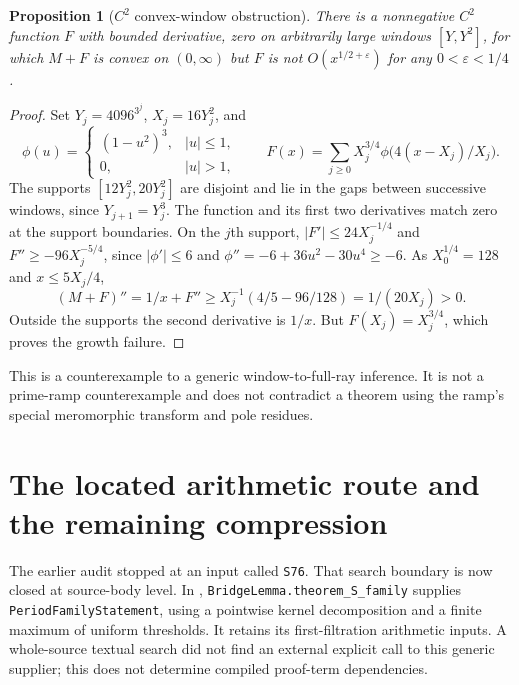 \documentclass[11pt,letterpaper]{article}
\newtheorem{proposition}[theorem]{Proposition}
\theoremstyle{definition}
\theoremstyle{remark}
\numberwithin{equation}{section}
\begin{document}
\begin{proposition}[$C^2$ convex-window obstruction]\label{prop:windows}
There is a nonnegative $C^2$ function $F$ with bounded derivative, zero on arbitrarily large windows $[Y,Y^2]$, for which $M+F$ is convex on $(0,\infty)$ but $F$ is not $O(x^{1/2+\varepsilon})$ for any $0<\varepsilon<1/4$.
\end{proposition}
\begin{proof}
Set $Y_j=4096^{3^j}$, $X_j=16Y_j^2$, and
\[
 \phi(u)=\begin{cases}(1-u^2)^3,&|u|\le1,\\0,&|u|>1,\end{cases}
 \qquad F(x)=\sum_{j\ge0}X_j^{3/4}\phi\bigl(4(x-X_j)/X_j\bigr).
\]
The supports $[12Y_j^2,20Y_j^2]$ are disjoint and lie in the gaps between successive windows, since $Y_{j+1}=Y_j^3$. The function and its first two derivatives match zero at the support boundaries. On the $j$th support, $|F'|\le24X_j^{-1/4}$ and $F''\ge-96X_j^{-5/4}$, since $|\phi'|\le6$ and $\phi''=-6+36u^2-30u^4\ge-6$. As $X_0^{1/4}=128$ and $x\le5X_j/4$,
\[
 (M+F)''=1/x+F''\ge X_j^{-1}(4/5-96/128)=1/(20X_j)>0.
\]
Outside the supports the second derivative is $1/x$. But $F(X_j)=X_j^{3/4}$, which proves the growth failure.
\end{proof}
This is a counterexample to a generic window-to-full-ray inference. It is not a prime-ramp counterexample and does not contradict a theorem using the ramp's special meromorphic transform and pole residues.

\section{The located arithmetic route and the remaining compression}

The earlier audit stopped at an input called \texttt{S76}. That search boundary is now closed at source-body level. In , \texttt{BridgeLemma.theorem\_S\_family} supplies \texttt{PeriodFamilyStatement}, using a pointwise kernel decomposition and a finite maximum of uniform thresholds. It retains its first-filtration arithmetic inputs. A whole-source textual search did not find an external explicit call to this generic supplier; this does not determine compiled proof-term dependencies.
\end{document}
